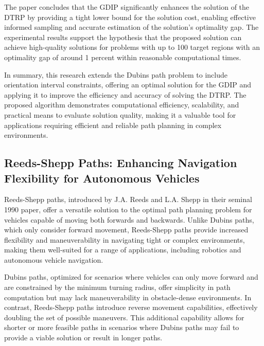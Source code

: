 \vspace*{6mm}

The paper concludes that the GDIP significantly enhances the solution of the DTRP by providing a tight lower bound for the solution cost, enabling effective informed sampling and accurate estimation of the solution's optimality gap. The experimental results support the hypothesis that the proposed solution can achieve high-quality solutions for problems with up to 100 target regions with an optimality gap of around 1 percent within reasonable computational times.

\vspace*{6mm}

In summary, this research extends the Dubins path problem to include orientation interval constraints, offering an optimal solution for the GDIP and applying it to improve the efficiency and accuracy of solving the DTRP. The proposed algorithm demonstrates computational efficiency, scalability, and practical means to evaluate solution quality, making it a valuable tool for applications requiring efficient and reliable path planning in complex environments.

\subsection{Reeds-Shepp Paths: Enhancing Navigation Flexibility for Autonomous Vehicles}


Reeds-Shepp paths, introduced by J.A. Reeds and L.A. Shepp in their seminal 1990 paper, offer a versatile solution to the optimal path planning problem for vehicles capable of moving both forwards and backwards. Unlike Dubins paths, which only consider forward movement, Reeds-Shepp paths provide increased flexibility and maneuverability in navigating tight or complex environments, making them well-suited for a range of applications, including robotics and autonomous vehicle navigation.

\vspace*{6mm}

Dubins paths, optimized for scenarios where vehicles can only move forward and are constrained by the minimum turning radius, offer simplicity in path computation but may lack maneuverability in obstacle-dense environments. In contrast, Reeds-Shepp paths introduce reverse movement capabilities, effectively doubling the set of possible maneuvers. This additional capability allows for shorter or more feasible paths in scenarios where Dubins paths may fail to provide a viable solution or result in longer paths.

